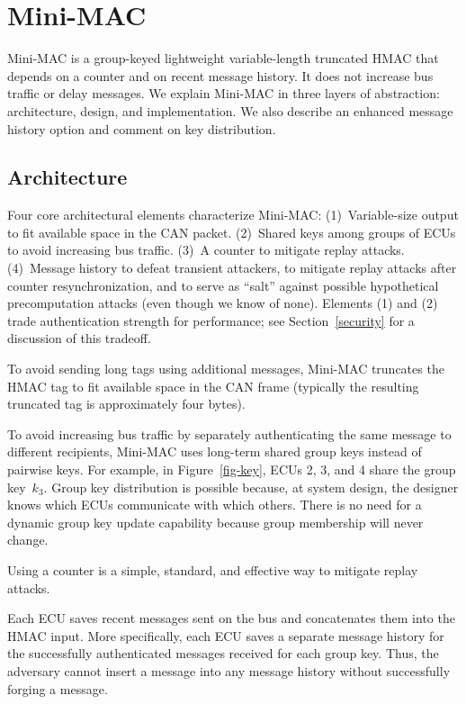 \section{Mini-MAC}
\label{mini-mac}

Mini-MAC is a group-keyed lightweight variable-length truncated HMAC that
depends on a counter and on recent message history.  It does not increase
bus traffic or delay messages.  We explain Mini-MAC in three layers
of abstraction: architecture, design, and  implementation.
We also describe an enhanced message history option
and comment on key distribution.

\subsection{Architecture}
\label{arch}

Four core architectural elements characterize Mini-MAC:
(1)~Variable-size output to fit available space in the CAN packet.
(2)~Shared keys among groups of ECUs to avoid increasing bus traffic.
(3)~A counter to mitigate replay attacks.
(4)~Message history to defeat transient attackers, 
to mitigate replay attacks after counter resynchronization, 
and to serve as ``salt'' against possible hypothetical precomputation attacks 
(even though we know of none).
Elements (1) and (2) trade authentication strength for performance;  see
Section~\ref{security} for a discussion of this tradeoff.

To avoid sending long tags using additional messages, Mini-MAC truncates the
HMAC tag to fit available space in the CAN frame 
(typically the resulting truncated tag is approximately four bytes).  

To avoid increasing bus traffic by separately authenticating the same message to different recipients, 
Mini-MAC uses long-term shared group keys instead of pairwise keys.  For example, in Figure~\ref{fig-key}, ECUs
2, 3, and 4 share the group key~$k_3$.
Group key distribution is possible because, at system design, the designer knows which ECUs communicate with which others. 
There is no need for a dynamic group key update capability because group membership will never change.

Using a counter is a simple, standard, and effective way to mitigate replay attacks.  

Each ECU saves recent messages sent on the bus and concatenates them into the HMAC input. 
More specifically, each ECU saves a separate message history for the 
successfully authenticated messages received for each group key.  
Thus, the adversary cannot insert a message into any message history without 
successfully forging a message.

